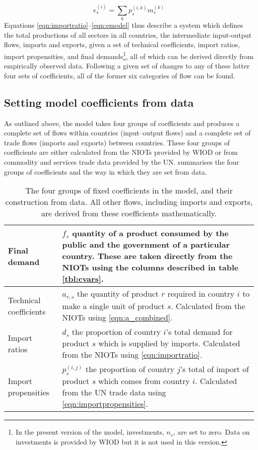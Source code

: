 \documentclass{article}
\begin{document}
\begin{equation}\label{eqn:emodel}
e_s^{(i)} = \sum_k{p_s^{(i,k)}m_s^{(k)}}
\end{equation}
Equations \eqref{eqn:importratio}--\eqref{eqn:emodel} thus describe a system which defines the total productions of all sectors in all countries, the intermediate input-output flows, imports and exports, given a set of technical coefficients, import ratios, import propensities, and final demands\footnote{In the present version of the model, investments, $n_s$, are set to zero. 
Data on investments is provided by WIOD but it is not used in this version.}, all of which can be derived directly from empirically observed data.
Following a given set of changes to any of these latter four sets of coefficients, all of the former six categories of flow can be found.

\subsection{Setting model coefficients from data}
As outlined above, the model takes four groups of coefficients and produces a complete set of flows within countries (input--output flows) and a complete set of trade flows (imports and exports) between countries.
These four groups of coefficients are either calculated from the NIOTs provided by WIOD or from commodity and services trade data provided by the UN.
 summarises the four groups of coefficients and the way in which they are set from data.
\begin{table}
    \centering
    \caption{The four groups of fixed coefficients in the model, and their construction from data.
    All other flows, including imports and exports, are derived from these coefficients  mathematically.}
    \label{tbl:the_four_things}
    \begin{tabular}{lp{8cm}}
        \toprule
    Final demand &  $f_s$ quantity of a product consumed by the public and the government of a
    particular country.
    These are taken directly from the NIOTs using the columns described in table \ref{tbl:cvars}. \\
    \midrule
    Technical coefficients &  $a_{r,s}$ the quantity of product $r$ required in country $i$
    to make a single unit of product $s$. Calculated from the NIOTs using \cref{eqn:a_combined}. \\
    \midrule
    Import ratios &  $d_s$ the proportion of country $i$'s total demand for product $s$ which is
    supplied by imports. Calculated from the NIOTs using \cref{eqn:importratio}. \\
    \midrule
    Import propensities &  $p_s^{(i,j)}$ the proportion of country $j$'s total of import of
    product $s$ which comes from country $i$. Calculated from the UN trade data using
    \cref{eqn:importpropensities}.\\
    \bottomrule
    \end{tabular}
\end{table}
\end{document}
